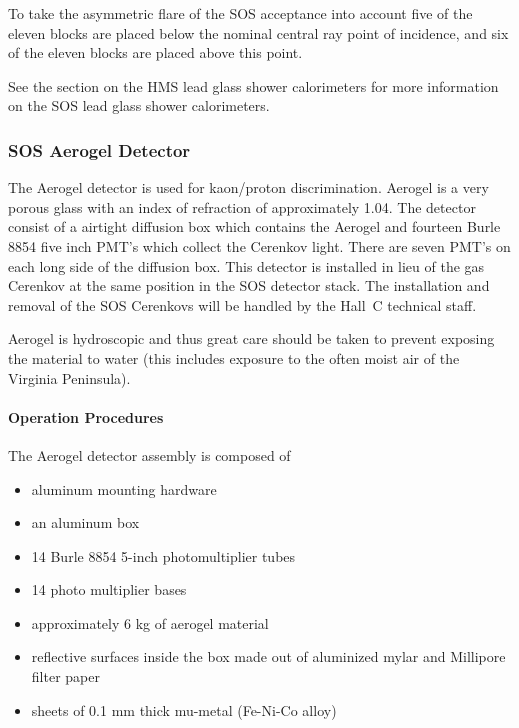 To take the asymmetric flare of the SOS acceptance into account five of the
eleven blocks are placed below the nominal central ray point of incidence,
and six of the eleven blocks are placed above this point.

See the section on the HMS lead glass shower calorimeters for
 more information on the SOS lead glass
shower calorimeters.


\subsubsection{SOS Aerogel Detector }

The Aerogel detector is used for kaon/proton discrimination.
Aerogel is a very porous glass with an index of refraction of approximately
1.04.
The detector consist of a airtight diffusion box which contains the
Aerogel and fourteen Burle 8854 five inch PMT's which collect
the Cerenkov light. There are seven PMT's on each long side of the diffusion
box.
This detector is installed in lieu of the gas Cerenkov
at the same position in the SOS detector stack. The installation and
removal of the SOS Cerenkovs will be handled by the Hall~C technical staff.

Aerogel is hydroscopic and thus great care should be taken to prevent
exposing the material to water (this includes exposure to the often moist
air of the Virginia Peninsula).


\paragraph{Operation Procedures}

The Aerogel detector assembly is composed of

\begin{itemize}
\item{aluminum mounting hardware}
\item{an aluminum box}
\item{14 Burle 8854 5-inch photomultiplier tubes}
\item{14 photo multiplier bases}
\item{approximately 6 kg of aerogel material}
\item{reflective surfaces inside the box made out of
aluminized mylar and Millipore filter paper}
\item{sheets of 0.1 mm thick mu-metal (Fe-Ni-Co alloy)}
\end{itemize}

